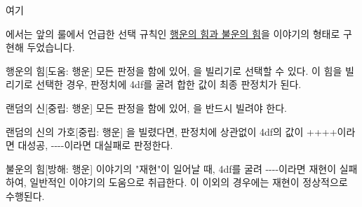 \documentclass{report}
\begin{document}
	\hypertarget{story:luck-unluck}{여기}에서는 앞의 룰에서 언급한 선택 규칙인 \hyperlink{pow-of-luck-unluck}{행운의 힘과 불운의 힘}을 이야기의 형태로 구현해 두었습니다.
	
	\begin{story}{행운의 힘}{[도움: 행운]}
		모든 판정을 함에 있어, 을 빌리기로 선택할 수 있다. 이 힘을 빌리기로 선택한 경우, 판정치에 4df를 굴려 합한 값이 최종 판정치가 된다.
	\end{story}
	
	\begin{story}{랜덤의 신}{[중립: 행운]}
		모든 판정을 함에 있어, 을 반드시 빌려야 한다.
	\end{story}
	
	\begin{story}{랜덤의 신의 가호}{[중립: 행운]}
		을 빌렸다면, 판정치에 상관없이 4df의 값이 ++++이라면 대성공, -{}-{}-{}-이라면 대실패로 판정한다.
	\end{story}
	
	\begin{story}{불운의 힘}{[방해: 행운]}
		이야기의 "재현"이 일어날 때, 4df를 굴려 -{}-{}-{}-이라면 재현이 실패하여, 일반적인 이야기의 도움으로 취급한다. 이 이외의 경우에는 재현이 정상적으로 수행된다.
	\end{story}
\end{document}
